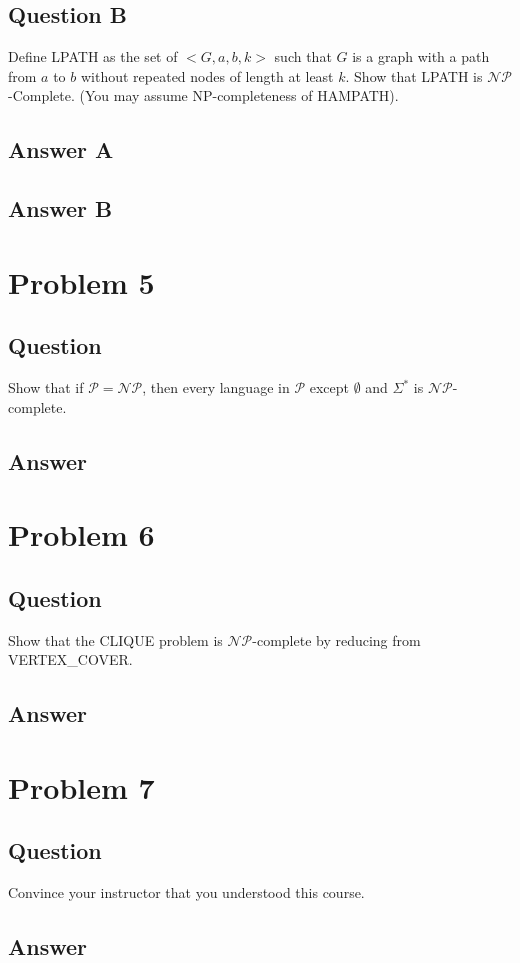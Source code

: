 \documentclass[12pt, a4paper]{article}
\begin{document}
\subsection{Question B}
Define LPATH as the set of $<G,a,b,k>$ such that $G$ is a graph with a path from $a$ to $b$ without repeated nodes of length at least $k$. Show that LPATH is $\mathcal{NP}$-Complete. (You may assume NP-completeness of 
HAMPATH).
\subsection{Answer A}
\subsection{Answer B}

\section{Problem 5}
\subsection{Question}
Show that if $\mathcal{P=NP}$, then every language in $\mathcal{P}$ except $\emptyset$ and $\Sigma^{*}$ is $\mathcal{NP}$-complete.
\subsection{Answer}

\section{Problem 6}
\subsection{Question}
Show that the CLIQUE problem is $\mathcal{NP}$-complete by reducing from VERTEX\_COVER.
\subsection{Answer}

\section{Problem 7}
\subsection{Question}
Convince your instructor that you understood this course.
\subsection{Answer}
\end{document}
